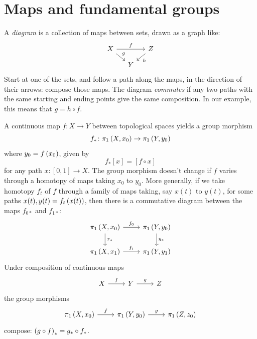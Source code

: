 \section{Maps and fundamental groups}
A \emph{diagram} is a collection of maps between sets, drawn as a graph like:
\[
\begin{tikzcd}[column sep=small, row sep=small]
X \arrow[rr,"f"] \arrow[dr,"g"] & & Z \arrow[dl,"h"] \\
{} & Y & {}
\end{tikzcd}
\]
Start at one of the sets, and follow a path along the maps, in the direction of their arrows: compose those maps.
The diagram \emph{commutes} if any two paths with the same starting and ending points give the same composition.
In our example, this means that \(g=h \circ f\).

\begin{lemma}
A continuous map \(f \colon X \to Y\) between topological spaces yields a group morphism
\[
f_* \colon \pi_{1}\left(X,x_0\right) \to \pi_{1}\left(Y,y_0\right)
\]
where \(y_0=f\left(x_0\right)\), given by
\[
f_* [x]=[f \circ x]
\]
for any path \(x \colon [0,1] \to X\).
The group morphism doesn't change if \(f\) varies through a homotopy of maps taking \(x_0\) to \(y_0\).
More generally, if we take homotopy \(f_t\) of \(f\) through a family of maps taking, say \(x(t)\) to \(y(t)\), for some paths \(x(t), y(t)=f_t\left(x(t)\right)\), then there is a commutative diagram between the maps \(f_{0*}\) and \(f_{1*}\):
\[
\begin{tikzcd}
\fundamentalGroup{X,x_0} \arrow{r}{f_0} \arrow{d}{x_*} & \fundamentalGroup{Y,y_0} \arrow{d}{y_*} \\
\fundamentalGroup{X,x_1} \arrow{r}{f_1} & \fundamentalGroup{Y,y_1}
\end{tikzcd}
\]
Under composition of continuous maps
\[
\begin{tikzcd}
X \arrow{r}{f}  & Y \arrow{r}{g} & Z
\end{tikzcd}
\]
the group morphisms 
\[
\begin{tikzcd}
\fundamentalGroup{X,x_0} \arrow{r}{f}  & \fundamentalGroup{Y,y_0} \arrow{r}{g} & \fundamentalGroup{Z,z_0}
\end{tikzcd}
\]
compose: \(\left(g \circ f\right)_* = g_* \circ f_*\).
\end{lemma}

